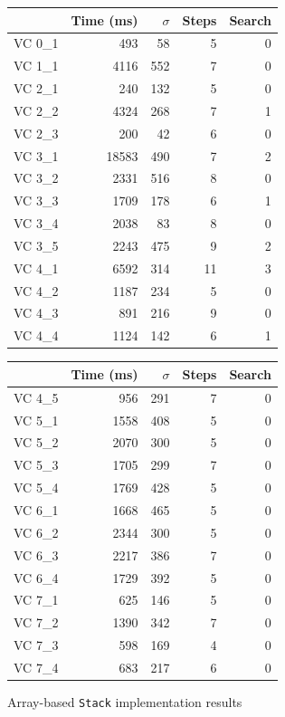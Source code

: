 \begin{figure}
	\centering
	\begin{tabular}{lrrrr}
		\toprule
			& Time (ms)	& $\sigma$& Steps & Search \\
		\midrule
		VC 0\_1	& 493		& 58	& 5 	& 0     \\
		VC 1\_1	& 4116		& 552	& 7 	& 0     \\
		VC 2\_1	& 240		& 132	& 5 	& 0     \\
		VC 2\_2	& 4324		& 268	& 7 	& 1     \\
		VC 2\_3	& 200		& 42	& 6 	& 0     \\
		VC 3\_1	& 18583		& 490	& 7 	& 2     \\
		VC 3\_2	& 2331		& 516	& 8 	& 0     \\
		VC 3\_3	& 1709		& 178	& 6 	& 1     \\
		VC 3\_4	& 2038		& 83	& 8 	& 0     \\
		VC 3\_5	& 2243		& 475	& 9 	& 2     \\
		VC 4\_1	& 6592 		& 314	& 11	& 3     \\
		VC 4\_2	& 1187		& 234	& 5 	& 0     \\
		VC 4\_3	& 891		& 216	& 9 	& 0     \\
		VC 4\_4	& 1124		& 142	& 6 	& 1     \\
		\bottomrule
	\end{tabular}
	\qquad
	\begin{tabular}{lrrrr}
		\toprule
			& Time (ms)	& $\sigma$& Steps & Search \\
		\midrule
		VC 4\_5	& 956		& 291	& 7 	& 0     \\
		VC 5\_1	& 1558 		& 408	& 5 	& 0     \\
		VC 5\_2	& 2070		& 300	& 5 	& 0     \\
		VC 5\_3	& 1705		& 299	& 7 	& 0     \\
		VC 5\_4	& 1769		& 428	& 5 	& 0     \\
		VC 6\_1	& 1668 		& 465	& 5 	& 0     \\
		VC 6\_2	& 2344		& 300	& 5 	& 0     \\
		VC 6\_3	& 2217		& 386	& 7 	& 0     \\
		VC 6\_4	& 1729		& 392	& 5 	& 0     \\
		VC 7\_1	& 625 		& 146	& 5 	& 0     \\
		VC 7\_2	& 1390		& 342	& 7 	& 0     \\
		VC 7\_3	& 598		& 169	& 4 	& 0     \\
		VC 7\_4	& 683		& 217	& 6 	& 0     \\
		\bottomrule
	\end{tabular}
	\caption{Array-based \texttt{Stack} implementation results\label{fig:stackResults}}
\end{figure}

